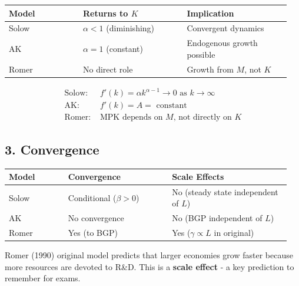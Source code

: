 \begin{tabular}{p{0.25\linewidth}p{0.35\linewidth}p{0.35\linewidth}}
\toprule
\textbf{Model} & \textbf{Returns to $K$} & \textbf{Implication} \\
\midrule
Solow & $\alpha < 1$ (diminishing) & Convergent dynamics \\
AK & $\alpha = 1$ (constant) & Endogenous growth possible \\
Romer & No direct role & Growth from $M$, not $K$ \\
\bottomrule
\end{tabular}

\bigskip
\begin{resultbox}
\begin{align*}
\text{Solow: } & f'(k) = \alpha k^{\alpha-1} \to 0 \text{ as } k \to \infty \\
\text{AK: } & f'(k) = A = \text{ constant} \\
\text{Romer: } & \text{MPK depends on } M \text{, not directly on } K
\end{align*}
\end{resultbox}

\subsection*{3. Convergence}

\begin{tabular}{p{0.2\linewidth}p{0.35\linewidth}p{0.4\linewidth}}
\toprule
\textbf{Model} & \textbf{Convergence} & \textbf{Scale Effects} \\
\midrule
Solow & Conditional ($\beta > 0$) & No (steady state independent of $L$) \\
AK & No convergence & No (BGP independent of $L$) \\
Romer & Yes (to BGP) & Yes ($\gamma \propto L$ in original) \\
\bottomrule
\end{tabular}

\bigskip
\begin{tcolorbox}[colback=yellow!10,colframe=yellow!60,title=Scale Effects]
Romer (1990) original model predicts that larger economies grow faster because more resources are devoted to R\&D. This is a \textbf{scale effect} - a key prediction to remember for exams.
\end{tcolorbox}

